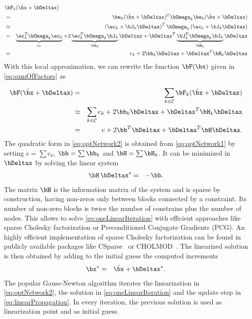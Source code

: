 \documentclass[a4paper]{article}
\begin{document}
\vspace{-3.5mm}
{\small
\begin{eqnarray}
\lefteqn{\bF_{k}(\breve{\bx} + \bDeltax) }\\
&=&  \be_{k}(\breve{\bx} + \bDeltax)^T \bOmega_{k} \be_{k}(\breve{\bx} + \bDeltax)  \\
\label{eq:errorQuad1}
             &\simeq& \left(\ec_{k} + \bJ_{k} \bDeltax \right)^T \bOmega_{k} \left(\ec_{k} + \bJ_{k} \bDeltax \right)  \\
\label{eq:errorQuad2}
             &=& \underbrace{\ec_{k}^T \bOmega_{k}\ec_{k}}_{\mathrm{c}_{k}} + 2 \underbrace{\ec_{k}^T \bOmega_{k} \bJ_{k}}_{\bb_{k}} \bDeltax +
 \bDeltax^T \underbrace{\bJ_{k}^T \bOmega_{k}\bJ_{k}}_{\bH_{k}} \bDeltax \\
             &=&\mathrm{c}_{k} + 2 \bb_{k} \bDeltax + \bDeltax^T \bH_{k} \bDeltax
\label{eq:errorQuad}
\end{eqnarray}
}
With this local approximation, we can rewrite the function
$\bF(\bx)$ given in \eqref{eq:sumOfFactors} as

\vspace{-3.5mm}
{\small
\begin{eqnarray}
\bF(\breve{\bx} + \bDeltax) &=& \sum_{k \in\mathcal{C}} \bF_{k}(\breve{\bx} + \bDeltax)
\label{eq:optNetwork0}\\
                      &\simeq& \sum_{k \in\mathcal{C}} \mathrm{c}_{k} + 2 \bb_{k} \bDeltax + \bDeltax^T \bH_{k} \bDeltax
\label{eq:optNetwork1}\\
                      &=&\mathrm{c} + 2 \bb^T \bDeltax + \bDeltax^T \bH \bDeltax.
\label{eq:optNetwork2}
\end{eqnarray}
} The quadratic form in \eqref{eq:optNetwork2} is obtained from
\eqref{eq:optNetwork1} by setting $\mathrm{c}=\sum \mathrm{c}_{k}$,
$\bb=\sum \bb_{k}$ and $\bH=\sum \bH_{k}$. It can be minimized in
$\bDeltax$ by solving the linear system
\begin{eqnarray}
       \bH\,\bDeltax^* &=& - \bb.
\label{eq:oneLinearIteration}
\end{eqnarray}
The matrix $\bH$ is the information matrix of the system and is sparse
by construction, having non-zeros only between blocks connected by a
constraint.  Its number of non-zero blocks is twice the number of
constrains plus the number of nodes. This allows to solve
\eqref{eq:oneLinearIteration} with efficient approaches like sparse
Cholesky factorization or Preconditioned Conjugate Gradients (PCG). An
highly efficient implementation of sparse Cholesky factorization can
be found in publicly available packages like CSparse~\cite{csparse} or
CHOLMOD~\cite{cholmod}.  The linearized solution is then obtained by
adding to the initial guess the computed increments
\begin{eqnarray}
  \bx^*&=&\breve{\bx}+\bDeltax^*.
\label{eq:linearPropagation}
\end{eqnarray}
The popular Gauss-Newton algorithm iterates the linearization in
\eqref{eq:optNetwork2}, the solution in \eqref{eq:oneLinearIteration}
and the update step in \eqref{eq:linearPropagation}. In every
iteration, the previous solution is used as linearization point and as
initial guess.
\end{document}
